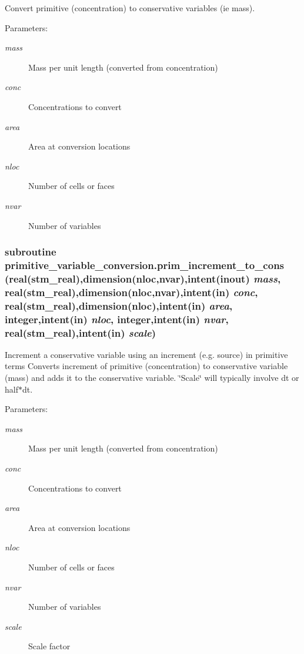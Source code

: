 Convert primitive (concentration) to conservative variables (ie mass). 

\begin{Desc}
\item[Parameters:]
\begin{description}
\item[{\em mass}]Mass per unit length (converted from concentration)\item[{\em conc}]Concentrations to convert\item[{\em area}]Area at conversion locations\item[{\em nloc}]Number of cells or faces\item[{\em nvar}]Number of variables \end{description}
\end{Desc}
\hypertarget{a00067_20339ce5df07783e776535c314dbb515}{
\subsubsection[{prim\_\-increment\_\-to\_\-cons}]{\setlength{\rightskip}{0pt plus 5cm}subroutine primitive\_\-variable\_\-conversion.prim\_\-increment\_\-to\_\-cons (real(stm\_\-real),dimension(nloc,nvar),intent(inout) {\em mass}, \/  real(stm\_\-real),dimension(nloc,nvar),intent(in) {\em conc}, \/  real(stm\_\-real),dimension(nloc),intent(in) {\em area}, \/  integer,intent(in) {\em nloc}, \/  integer,intent(in) {\em nvar}, \/  real(stm\_\-real),intent(in) {\em scale})}}
\label{a00067_20339ce5df07783e776535c314dbb515}


Increment a conservative variable using an increment (e.g. source) in primitive terms Converts increment of primitive (concentration) to conservative variable (mass) and adds it to the conservative variable. \char`\"{}Scale\char`\"{} will typically involve dt or half$\ast$dt. 

\begin{Desc}
\item[Parameters:]
\begin{description}
\item[{\em mass}]Mass per unit length (converted from concentration)\item[{\em conc}]Concentrations to convert\item[{\em area}]Area at conversion locations\item[{\em nloc}]Number of cells or faces\item[{\em nvar}]Number of variables\item[{\em scale}]Scale factor \end{description}
\end{Desc}
